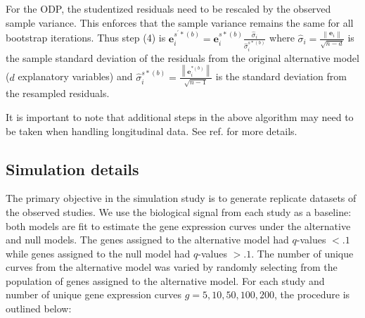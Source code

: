 \documentclass[11pt]{article}
\begin{document}
For the ODP, the studentized residuals need to be rescaled by the observed sample variance. This enforces that the sample variance remains the same for all bootstrap iterations. Thus step (4) is  $\mathbf{e}^{s^{\prime}*(b)}_{i} = \mathbf{e}^{s*(b)}_{i}\frac{\hat{\sigma}_{i} }{\hat{\sigma}^{s*(b)}_{i}}$ where $\hat{\sigma}_{i} = \frac{\left\lVert\mathbf{e}_{i}\right\rVert }{\sqrt{n-d}}$ is the sample standard deviation of the residuals from the original alternative model ($d$ explanatory variables) and $\hat{\sigma}^{s*(b)}_{i} = \frac{\left\lVert\mathbf{e}^{*(b)}_{i}\right\rVert }{\sqrt{n-1}}$ is the standard deviation from the resampled residuals.

It is important to note that additional steps in the above algorithm may need to be taken when handling longitudinal data. See ref. \cite{Storey_2005_time} for more details.

\subsection{Simulation details\label{Subsec:sims}}

The primary objective in the simulation study is to generate replicate datasets of the observed studies. We use the biological signal from each study as a baseline: both models are fit to estimate the gene expression curves under the alternative and null models. The genes assigned to the alternative model had $q$-values $<.1$ while genes assigned to the null model had $q$-values $>.1$. The number of unique curves from the alternative model was varied by randomly selecting from the population of genes assigned to the alternative model. For each study and number of unique gene expression curves $g = 5,10,50,100,200$, the procedure is outlined below:
\end{document}
